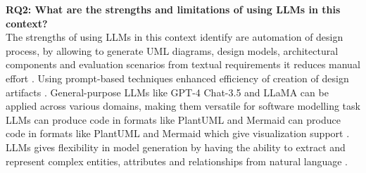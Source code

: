 \textbf{RQ2: What are the strengths and limitations of using LLMs in this context?}\\

The strengths of using LLMs in this context identify are automation of design process, by allowing to generate UML diagrams, design models, architectural components and evaluation scenarios from textual requirements it reduces manual effort  \cite{1deBari2024,4jahan2024,7eisenreich2024,3ahmad2023}.
Using prompt-based techniques enhanced efficiency of creation of design artifacts \cite{12li2024,14chaaben2023}.
General-purpose LLMs like GPT-4 Chat-3.5 and LLaMA can be applied across various domains, making them versatile for software modelling task \cite{7eisenreich2024,8z_wang2024}
LLMs can produce code in formats like PlantUML and Mermaid can produce code in formats like PlantUML and Mermaid which give visualization support \cite{7eisenreich2024,11omar2023}.
LLMs gives flexibility in model generation by having the ability to extract and represent complex entities, attributes and relationships from natural language \cite{2babaalla2024,9ruan2023}.

